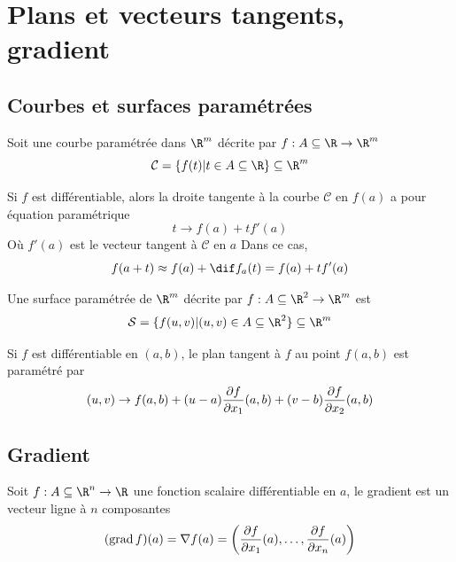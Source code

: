
\section{Plans et vecteurs tangents, gradient}

\subsection{Courbes et surfaces paramétrées}

\begin{mydef}
	Soit une courbe paramétrée dans $\R^m$ décrite par $f : A \subseteq \R \to \R^m$
	\[ \mathcal{C} = \{ f(t) | t \in A \subseteq \R \} \subseteq \R^m \]
\end{mydef}

\begin{myform}
	Si $f$ est différentiable, alors la droite tangente à la courbe $\mathcal{C}$ en $f(a)$ a pour équation paramétrique
	\[ t \to f(a) + t f'(a) \]
	Où $f'(a)$ est le vecteur tangent à $\mathcal{C}$ en $a$
	Dans ce cas,
	\[ f(a + t) \approx f(a) + \dif f_a(t) = f(a) + t f'(a) \]
\end{myform}

\begin{mydef}
	Une surface paramétrée de $\R^m$ décrite par $f : A \subseteq \R^2 \to \R^m$ est
	\[ \mathcal{S} = \{ f(u,v) | (u,v) \in A \subseteq \R^2 \} \subseteq \R^m \]
\end{mydef}

\begin{myform}
	Si $f$ est différentiable en $(a,b)$, le plan tangent à $f$ au point $f(a,b)$ est paramétré par
	\[ (u,v) \to f(a,b) + (u-a) \frac{\partial f}{\partial x_1} (a,b) + (v-b) \frac{\partial f}{\partial x_2}(a,b) \]
\end{myform}

\subsection{Gradient}

\begin{mydef}[Gradient] Soit $f : A \subseteq \R^n \to \R$ une fonction scalaire différentiable en $a$, le gradient est un vecteur ligne à $n$ composantes
	\[ (\operatorname{grad} f)(a) = \nabla f(a) = \left( \frac{\partial f}{\partial x_1}(a) , \dots, \frac{\partial f}{\partial x_n}(a) \right) \]
\end{mydef}

